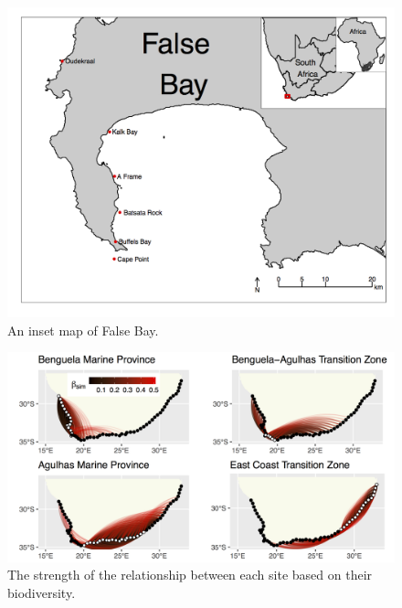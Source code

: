 \documentclass[
]{book}
\begin{document}
\begin{figure}

{\centering \includegraphics[width=1\linewidth]{figures/false_bay_inset_map_labels2} 

}

\caption{An inset map of False Bay.}\label{fig:example5}
\end{figure}

\begin{figure}

{\centering \includegraphics[width=1\linewidth]{figures/PLOS_ONE_Fig4} 

}

\caption{The strength of the relationship between each site based on their biodiversity.}\label{fig:example19}
\end{figure}
\end{document}
